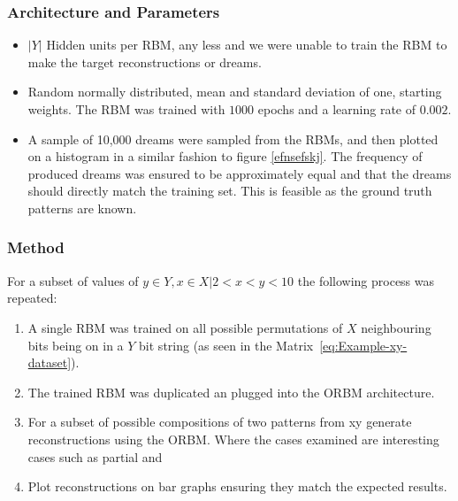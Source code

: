\subsubsection{Architecture and Parameters}
\begin{itemize}
  \item $|Y|$ Hidden units per RBM, any less and we were unable to train the RBM to make the target reconstructions or dreams.
  \item Random normally distributed, mean and standard deviation of one, starting weights. The RBM was trained with $1000$ epochs and a learning rate of $0.002$.
  \item A sample of 10,000 dreams were sampled from the RBMs, and then plotted on a histogram in a similar fashion to figure \ref{efnsefskj}. The frequency of produced dreams was ensured to be approximately equal and that the dreams should directly match the training set. This is feasible as the ground truth patterns are known.
\end{itemize}


\subsubsection{Method}

For a subset of values of $y \in Y, x \in X | 2 < x < y < 10$ the following process was repeated:

\begin{enumerate}
  \item A single RBM was trained on all possible permutations of $X$ neighbouring bits being on in a $Y$ bit string (as seen in the Matrix~\ref{eq:Example-xy-dataset}).
  \item The trained RBM was duplicated an plugged into the ORBM architecture.
  \item For a subset of possible compositions of two patterns from xy  generate reconstructions using the ORBM. Where the cases examined are interesting cases such as partial and 
  \item Plot reconstructions on bar graphs ensuring they match the expected results.
\end{enumerate}

%



